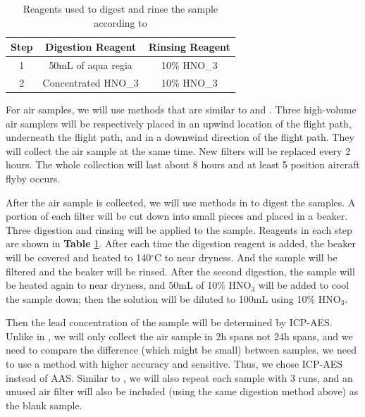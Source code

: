 \documentclass[12pt]{article}
\begin{document}
\begin{table}
    \centering
    \begin{tabular}[0.3\textwidth]{|c|c|c|}
    \hline
    Step & Digestion Reagent & Rinsing Reagent \\ \hline
    1 & 50mL of aqua regia & 10\% HNO_{3} \\ \hline
    2 & Concentrated HNO_{3} & 10\% HNO_{3} \\ \hline 
    \end{tabular}
    \caption{\small{Reagents used to digest and rinse the sample according to \supercite{gharaibeh_determination_2010}}}
    \label{tab:steps}
    \vspace{0.2cm}
\end{table}

For air samples, we will use methods that are similar to \supercite{gharaibeh_determination_2010} and \supercite{vijayanand_assessment_2008}. Three high-volume air samplers will be respectively placed in an upwind location of the flight path, underneath the flight path, and in a downwind direction of the flight path. They will collect the air sample at the same time. New filters will be replaced every 2 hours. The whole collection will last about 8 hours and at least 5 position aircraft flyby occurs. 


After the air sample is collected, we will use methods in \supercite{gharaibeh_determination_2010} to digest the samples. A portion of each filter will be cut down into small pieces and placed in a beaker. Three digestion and rinsing will be applied to the sample. Reagents in each step are shown in \textbf{Table} \ref{tab:steps}. After each time the digestion reagent is added, the beaker will be covered and heated to 140$^{\circ}$C to near dryness. And the sample will be filtered and the beaker will be rinsed. After the second digestion, the sample will be heated again to near dryness, and 50mL of 10\% HNO$_{3}$ will be added to cool the sample down; then the solution will be diluted to 100mL using 10\% HNO$_{3}$. \supercite{gharaibeh_determination_2010}


Then the lead concentration of the sample will be determined by ICP-AES. Unlike in \supercite{gharaibeh_determination_2010}, we will only collect the air sample in 2h spans not 24h spans, and we need to compare the difference (which might be small) between samples, we need to use a method with higher accuracy and sensitive. Thus, we chose ICP-AES instead of AAS. Similar to \supercite{gharaibeh_determination_2010}, we will also repeat each sample with 3 runs, and an unused air filter will also be included (using the same digestion method above) as the blank sample. 
\end{document}
